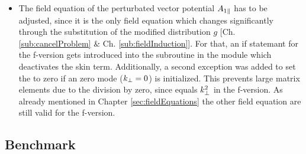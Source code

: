 \begin{itemize}
    \item The field equation of the perturbated vector potential $A_{1\parallel}$ has to be adjusted, since it is the only field equation which changes significantly through the substitution of the modified distribution $g$ [Ch. \ref{sub:cancelProblem} \& Ch. \ref{sub:fieldInduction}]. For that, an if statemant for the f-version gets introduced into the subroutine  in the module  which deactivates the skin term. Additionally, a second exception was added to set the  to zero if an zero mode ($k_\perp = 0$) is initialized. This prevents large matrix elements due to the division by zero, since  equals $k_\perp^2$ in the f-version. As already mentioned in Chapter \ref{sec:fieldEquations} the other field equation are still valid for the f-version.
\end{itemize}

\subsection{Benchmark}
\label{sub:benchmarkLinearFVersion}


